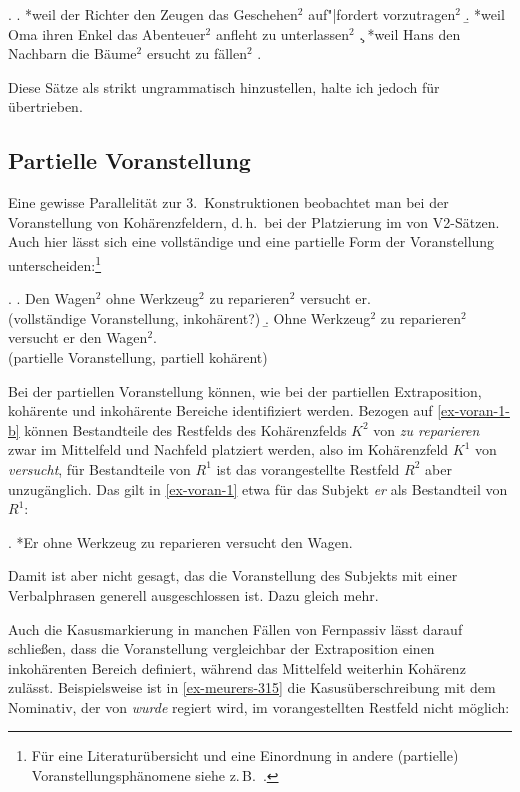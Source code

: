 \ex. 
\a. *weil der Richter den Zeugen das Geschehen$^2$ auf"|fordert vorzutragen$^2$
\b. *weil Oma ihren Enkel das Abenteuer$^2$ anfleht zu unterlassen$^2$
\c. *weil Hans den Nachbarn die Bäume$^2$ ersucht zu fällen$^2$ 
\z. \citep[(32)]{Grosse:05}

Diese Sätze als strikt ungrammatisch hinzustellen, halte ich jedoch für übertrieben.



\subsection{Partielle Voranstellung} \label{sec-kohaerenz-voran}

Eine gewisse Parallelität zur 3.~Konstruktionen beobachtet man bei der Voranstellung von Kohärenzfeldern, d.\,h.\ bei der Platzierung im  von V2-Sätzen. Auch hier lässt sich eine vollständige und eine partielle Form der Voranstellung unterscheiden:\footnote{Für eine Literaturübersicht und eine Einordnung in andere (partielle) Voranstellungsphänomene siehe z.\,B.\ \citet[Kapitel~9]{Meurers:99}.}

\ex. \label{ex-voran-1}
\a. Den Wagen$^2$ ohne Werkzeug$^2$ zu reparieren$^2$ versucht er. \\
(vollständige Voranstellung, inkohärent?)
\b. Ohne Werkzeug$^2$ zu reparieren$^2$ versucht er den Wagen$^2$. \\
(partielle Voranstellung, partiell kohärent)\label{ex-voran-1-b}

Bei der partiellen Voranstellung können, wie bei der partiellen Extraposition, kohärente und inkohärente Bereiche identifiziert werden. Bezogen auf \ref{ex-voran-1-b} können Bestandteile des Restfelds des Kohärenzfelds $K^2$ von {\it zu reparieren} zwar im Mittelfeld und Nachfeld platziert werden, also im Kohärenzfeld $K^1$ von {\it versucht}, für Bestandteile von $R^1$ ist das vorangestellte Restfeld $R^2$ aber unzugänglich. Das gilt in \ref{ex-voran-1} etwa für das Subjekt \textit{er} als Bestandteil von $R^1$:

\ex. *Er ohne Werkzeug zu reparieren versucht den Wagen. \label{ex-voran}    

Damit ist aber nicht gesagt, das die Voranstellung des Subjekts mit einer Verbalphrasen generell ausgeschlossen ist. Dazu gleich mehr.

Auch die Kasusmarkierung in manchen Fällen von Fernpassiv lässt darauf schlie\-ßen, dass die Voranstellung vergleichbar der Extraposition einen inkohärenten Bereich definiert, während das Mittelfeld weiterhin Kohärenz zulässt. Beispielsweise ist in \ref{ex-meurers-315} die Kasusüberschreibung mit dem Nominativ, der von {\it wurde} regiert wird, im vorangestellten Restfeld nicht möglich: 
  
